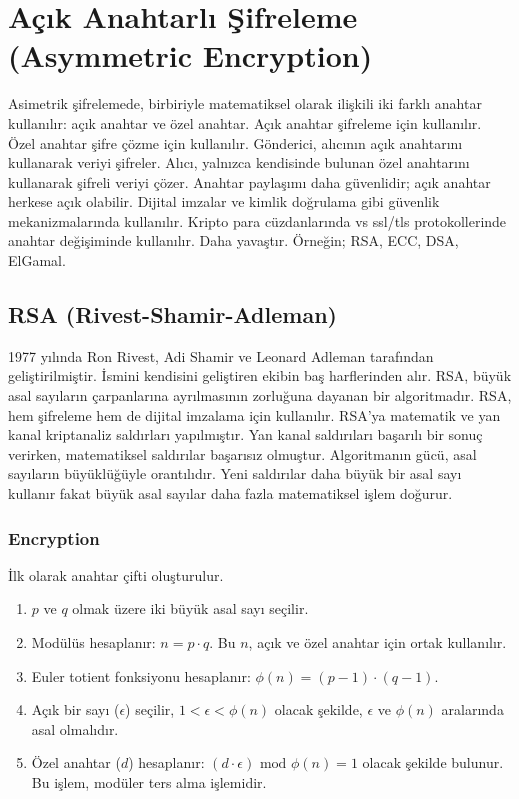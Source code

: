 \section{Açık Anahtarlı Şifreleme (Asymmetric Encryption)}

Asimetrik şifrelemede, birbiriyle matematiksel olarak ilişkili iki farklı anahtar kullanılır: açık anahtar ve özel anahtar. Açık anahtar şifreleme için kullanılır. Özel anahtar şifre çözme için kullanılır. Gönderici, alıcının açık anahtarını kullanarak veriyi şifreler. Alıcı, yalnızca kendisinde bulunan özel anahtarını kullanarak şifreli veriyi çözer. Anahtar paylaşımı daha güvenlidir; açık anahtar herkese açık olabilir. Dijital imzalar ve kimlik doğrulama gibi güvenlik mekanizmalarında kullanılır. Kripto para cüzdanlarında vs ssl/tls protokollerinde anahtar değişiminde kullanılır. Daha yavaştır. Örneğin; RSA, ECC, DSA, ElGamal.

\subsection{RSA (Rivest-Shamir-Adleman)}

1977 yılında Ron Rivest, Adi Shamir ve Leonard Adleman tarafından geliştirilmiştir. İsmini kendisini geliştiren ekibin baş harflerinden alır. RSA, büyük asal sayıların çarpanlarına ayrılmasının zorluğuna dayanan bir algoritmadır. RSA, hem şifreleme hem de dijital imzalama için kullanılır. RSA'ya matematik ve yan kanal kriptanaliz saldırları yapılmıştır. Yan kanal saldırıları başarılı bir sonuç verirken, matematiksel saldırılar başarısız olmuştur. Algoritmanın gücü, asal sayıların büyüklüğüyle orantılıdır. Yeni saldırılar daha büyük bir asal sayı kullanır fakat büyük asal sayılar daha fazla matematiksel işlem doğurur.

\subsubsection{Encryption}

İlk olarak anahtar çifti oluşturulur.

\begin{enumerate}
    \item $p$ ve $q$ olmak üzere iki büyük asal sayı seçilir.
    \item Modülüs hesaplanır: $n = p \cdot q$. Bu $n$, açık ve özel anahtar için ortak kullanılır.
    \item Euler totient fonksiyonu hesaplanır: $\phi(n) = (p - 1) \cdot (q - 1)$.
    \item Açık bir sayı ($\epsilon$) seçilir, $1 < \epsilon < \phi(n)$ olacak şekilde, $\epsilon$ ve $\phi(n)$ aralarında asal olmalıdır.
    \item Özel anahtar ($d$) hesaplanır: $(d \cdot \epsilon) \text{ mod } \phi(n) = 1$ olacak şekilde bulunur. Bu işlem, modüler ters alma işlemidir.
\end{enumerate}

